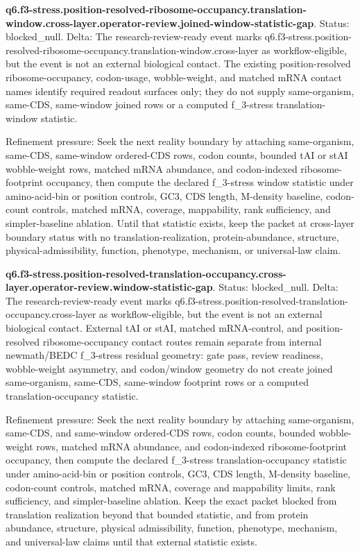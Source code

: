 \textbf{q6.f3-stress.position-resolved-ribosome-occupancy.translation-window.cross-layer.operator-review.joined-window-statistic-gap}. Status: blocked\_null. Delta: The research-review-ready event marks q6.f3-stress.position-resolved-ribosome-occupancy.translation-window.cross-layer as workflow-eligible, but the event is not an external biological contact. The existing position-resolved ribosome-occupancy, codon-usage, wobble-weight, and matched mRNA contact names identify required readout surfaces only; they do not supply same-organism, same-CDS, same-window joined rows or a computed f\_3-stress translation-window statistic.

Refinement pressure: Seek the next reality boundary by attaching same-organism, same-CDS, same-window ordered-CDS rows, codon counts, bounded tAI or stAI wobble-weight rows, matched mRNA abundance, and codon-indexed ribosome-footprint occupancy, then compute the declared f\_3-stress window statistic under amino-acid-bin or position controls, GC3, CDS length, M-density baseline, codon-count controls, matched mRNA, coverage, mappability, rank sufficiency, and simpler-baseline ablation. Until that statistic exists, keep the packet at cross-layer boundary status with no translation-realization, protein-abundance, structure, physical-admissibility, function, phenotype, mechanism, or universal-law claim.

\textbf{q6.f3-stress.position-resolved-translation-occupancy.cross-layer.operator-review.window-statistic-gap}. Status: blocked\_null. Delta: The research-review-ready event marks q6.f3-stress.position-resolved-translation-occupancy.cross-layer as workflow-eligible, but the event is not an external biological contact. External tAI or stAI, matched mRNA-control, and position-resolved ribosome-occupancy contact routes remain separate from internal newmath/BEDC f\_3-stress residual geometry: gate pass, review readiness, wobble-weight asymmetry, and codon/window geometry do not create joined same-organism, same-CDS, same-window footprint rows or a computed translation-occupancy statistic.

Refinement pressure: Seek the next reality boundary by attaching same-organism, same-CDS, and same-window ordered-CDS rows, codon counts, bounded wobble-weight rows, matched mRNA abundance, and codon-indexed ribosome-footprint occupancy, then compute the declared f\_3-stress translation-occupancy statistic under amino-acid-bin or position controls, GC3, CDS length, M-density baseline, codon-count controls, matched mRNA, coverage and mappability limits, rank sufficiency, and simpler-baseline ablation. Keep the exact packet blocked from translation realization beyond that bounded statistic, and from protein abundance, structure, physical admissibility, function, phenotype, mechanism, and universal-law claims until that external statistic exists.

